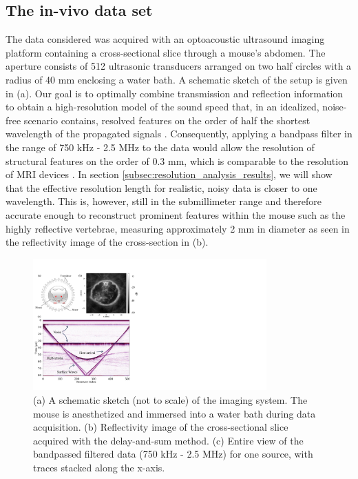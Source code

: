 \documentclass[12pt]{iopart}
\begin{document}
\subsection{The in-vivo data set}
\label{sec:in_vivo_data_set}
The data considered was acquired with an optoacoustic ultrasound imaging platform \cite{lafci_IEEE_TUFFC} containing a cross-sectional slice through a mouse's abdomen. The aperture consists of 512 ultrasonic transducers arranged on two half circles with a radius of 40 mm enclosing a water bath. A schematic sketch of the setup is given in (a). Our goal is to optimally combine transmission and reflection information to obtain a high-resolution model of the sound speed that, in an idealized, noise-free scenario contains, resolved features on the order of half the shortest wavelength of the propagated signals \cite{Virieux_Operto_2009}. Consequently, applying a bandpass filter in the range of 750 kHz - 2.5 MHz to the data would allow the resolution of structural features on the order of 0.3 mm, which is comparable to the resolution of MRI devices \cite{Ranger_2012}. In section \ref{subsec:resolution_analysis_results}, we will show that the effective resolution length for realistic, noisy data is closer to one wavelength. This is, however, still in the submillimeter range and therefore accurate enough to reconstruct prominent features within the mouse such as the highly reflective vertebrae, measuring approximately 2 mm in diameter as seen in the reflectivity image of the cross-section in (b).
\begin{figure}[!h]
  \centering
  \includegraphics[width=0.8\textwidth]{figure2.pdf}
  \caption{(a) A schematic sketch (not to scale) of the imaging system. The mouse is anesthetized and immersed into a water bath during data acquisition. (b) Reflectivity image of the cross-sectional slice acquired with the delay-and-sum method. (c) Entire view of the bandpassed filtered data (750 kHz - 2.5 MHz) for one source, with traces stacked along the x-axis.}
  \label{fig:setup_shotgather_traces}
\end{figure}
\end{document}

